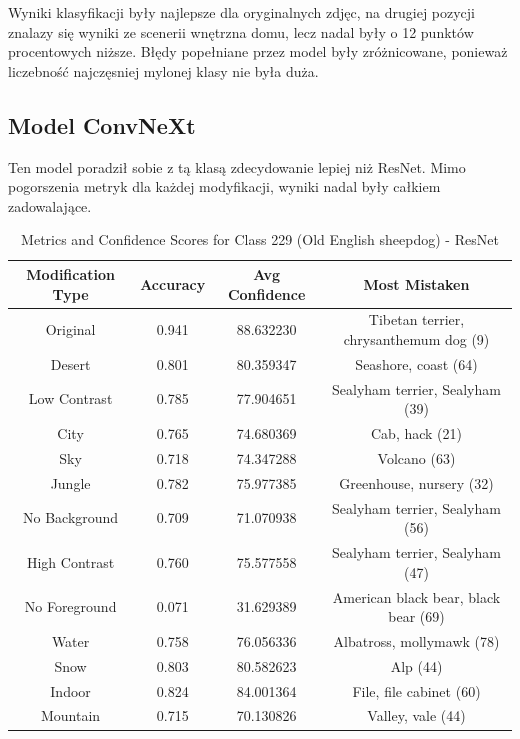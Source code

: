 Wyniki klasyfikacji były najlepsze dla oryginalnych zdjęc, na drugiej pozycji znalazy się wyniki ze scenerii wnętrzna domu, lecz nadal były o 12 punktów procentowych niższe. Błędy popełniane przez model były zróżnicowane, ponieważ liczebność najczęsniej mylonej klasy nie była duża.


\subsection*{Model ConvNeXt}

Ten model poradził sobie z tą klasą zdecydowanie lepiej niż ResNet. Mimo pogorszenia metryk dla każdej modyfikacji, wyniki nadal były całkiem zadowalające. 

\begin{table}
	\centering
	\begin{tabular}{|c|c|c|c|}
		\hline
		\textbf{Modification Type} & \textbf{Accuracy} & \textbf{Avg Confidence} & \textbf{Most Mistaken} \\
		\hline
		Original & 0.941 & 88.632230 & Tibetan terrier, chrysanthemum dog (9) \\
		\hline
		Desert & 0.801 & 80.359347 & Seashore, coast (64) \\
		\hline
		Low Contrast & 0.785 & 77.904651 & Sealyham terrier, Sealyham (39) \\
		\hline
		City & 0.765 & 74.680369 & Cab, hack (21) \\
		\hline
		Sky & 0.718 & 74.347288 & Volcano (63) \\
		\hline
		Jungle & 0.782 & 75.977385 & Greenhouse, nursery (32) \\
		\hline
		No Background & 0.709 & 71.070938 & Sealyham terrier, Sealyham (56) \\
		\hline
		High Contrast & 0.760 & 75.577558 & Sealyham terrier, Sealyham (47) \\
		\hline
		No Foreground & 0.071 & 31.629389 & American black bear, black bear (69) \\
		\hline
		Water & 0.758 & 76.056336 & Albatross, mollymawk (78) \\
		\hline
		Snow & 0.803 & 80.582623 & Alp (44) \\
		\hline
		Indoor & 0.824 & 84.001364 & File, file cabinet (60) \\
		\hline
		Mountain & 0.715 & 70.130826 & Valley, vale (44) \\
		\hline
	\end{tabular}
	\caption{Metrics and Confidence Scores for Class 229 (Old English sheepdog) - ResNet}
	\label{tab:metrics_confidence_class_229_resnet}
\end{table}

